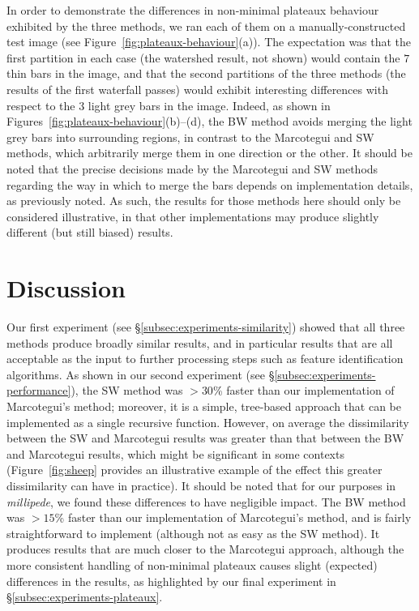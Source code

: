\documentclass[preprint,a4paper]{elsarticle}
\begin{document}
In order to demonstrate the differences in non-minimal plateaux behaviour exhibited by the three methods, we ran each of them on a manually-constructed test image (see Figure~\ref{fig:plateaux-behaviour}(a)). The expectation was that the first partition in each case (the watershed result, not shown) would contain the $7$ thin bars in the image, and that the second partitions of the three methods (the results of the first waterfall passes) would exhibit interesting differences with respect to the $3$ light grey bars in the image. Indeed, as shown in Figures~\ref{fig:plateaux-behaviour}(b)--(d), the BW method avoids merging the light grey bars into surrounding regions, in contrast to the Marcotegui and SW methods, which arbitrarily merge them in one direction or the other. It should be noted that the precise decisions made by the Marcotegui and SW methods regarding the way in which to merge the bars depends on implementation details, as previously noted. As such, the results for those methods here should only be considered illustrative, in that other implementations may produce slightly different (but still biased) results.

\section{Discussion}
\label{sec:discussion}

Our first experiment (see \S\ref{subsec:experiments-similarity}) showed that all three methods produce broadly similar results, and in particular results that are all acceptable as the input to further processing steps such as feature identification algorithms. As shown in our second experiment (see \S\ref{subsec:experiments-performance}), the SW method was $> 30$\% faster than our implementation of Marcotegui's method; moreover, it is a simple, tree-based approach that can be implemented as a single recursive function. However, on average the dissimilarity between the SW and Marcotegui results was greater than that between the BW and Marcotegui results, which might be significant in some contexts (Figure~\ref{fig:sheep} provides an illustrative example of the effect this greater dissimilarity can have in practice). It should be noted that for our purposes in \emph{millipede}, we found these differences to have negligible impact. The BW method was $> 15$\% faster than our implementation of Marcotegui's method, and is fairly straightforward to implement (although not as easy as the SW method). It produces results that are much closer to the Marcotegui approach, although the more consistent handling of non-minimal plateaux causes slight (expected) differences in the results, as highlighted by our final experiment in \S\ref{subsec:experiments-plateaux}.
\end{document}
